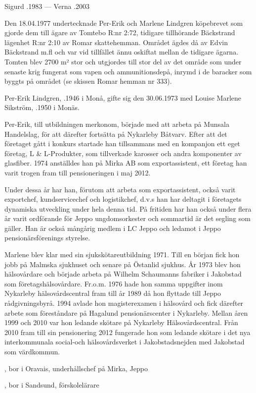 Sigurd .1983  ---  Verna .2003



%


%
Den 18.04.1977 undertecknade Per-Erik och Marlene Lindgren köpebrevet som gjorde dem till ägare av Tomtebo R:nr 2:72, tidigare tillhörande Bäckstrand lägenhet R:nr 2:10 av Romar skattehemman. Området ägdes då av Edvin Bäckstrand m.fl och var vid tillfället ännu oskiftat mellan de tidigare ägarna. Tomten blev 2700 m² stor och utgjordes till stor del av det område som under senaste krig fungerat som vapen och ammunitionsdepå, inrymd i de baracker som byggts på området (se skissen Romar hemman nr 333).

Per-Erik Lindgren, .1946 i Monå, gifte sig den 30.06.1973 med Louise Marlene Sikström, .1950 i Monäs.

Per-Erik, till utbildningen  merkonom, började med att arbeta på Munsala Handelslag, för att därefter fortsätta på Nykarleby Båtvarv. Efter att det företaget gått i konkurs startade han tillsammans med en kompanjon ett eget företag, L \& L-Produkter, som tillverkade karosser och andra komponenter av glasfiber. 1974 anställdes han på Mirka AB som exportassistent, ett företag han varit trogen fram till pensioneringen i maj 2012.

Under dessa år har han, förutom att arbeta som exportassistent, också varit exportchef, kundservicechef och logistikchef, d.v.s han har deltagit i företagets dynamiska utveckling under hela denna tid. På fritiden har han också under flera år varit ordförande för Jeppo ungdomsorkester och sommartid är det segling som gäller. Han är också mångårig medlem i LC Jeppo och ledamot i Jeppo pensionärsförenings styrelse.

Marlene blev klar med sin sjukskötareutbildning 1971. Till en början fick hon jobb på Malmska sjukhuset och senare på Östanlid sjukhus. År 1973 blev hon hälsovårdare och började arbeta på Wilhelm Schaumanns fabriker i Jakobstad som företagshälsovårdare. Fr.o.m. 1976 hade hon samma uppgifter inom Nykarleby hälsovårdscentral fram till år 1989 då hon flyttade till Jeppo rådgivningsbyrå. 1994 avlade hon magisterexamen i hälsovård och fick därefter arbete som föreståndare på Hagalund pensionärscenter i Nykarleby. Mellan åren 1999 och 2010 var hon ledande skötare på Nykarleby Hälsovårdscentral. Från 2010 fram till sin pensionering 2012 fungerade hon som ledande skötare i det nya interkommunala social-och hälsovårdsverket i Jakobstadsnejden med Jakobstad som värdkommun.
\begin{jhchildren}
  \item {}, bor i Oravais, underhållschef på Mirka, Jeppo
  \item {}, bor i Sandsund, förskolelärare
\end{jhchildren}




